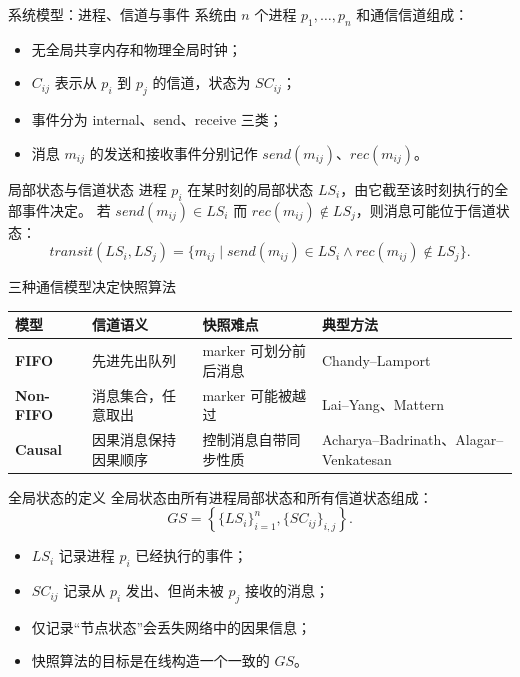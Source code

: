 \documentclass[UTF8,fontset=none,aspectratio=169,10pt]{beamer}
\begin{document}
\begin{frame}{系统模型：进程、信道与事件}
系统由 $n$ 个进程 $p_1,\ldots,p_n$ 和通信信道组成：
\begin{itemize}
  \item 无全局共享内存和物理全局时钟；
  \item $C_{ij}$ 表示从 $p_i$ 到 $p_j$ 的信道，状态为 $SC_{ij}$；
  \item 事件分为 internal、send、receive 三类；
  \item 消息 $m_{ij}$ 的发送和接收事件分别记作 $send(m_{ij})$、$rec(m_{ij})$。
\end{itemize}
\end{frame}

\begin{frame}{局部状态与信道状态}
进程 $p_i$ 在某时刻的局部状态 $LS_i$，由它截至该时刻执行的全部事件决定。
\vfill
若 $send(m_{ij})\in LS_i$ 而 $rec(m_{ij})\notin LS_j$，则消息可能位于信道状态：
\[
transit(LS_i,LS_j)=\{m_{ij}\mid send(m_{ij})\in LS_i\land rec(m_{ij})\notin LS_j\}.
\]
\vfill
{}
\end{frame}

\begin{frame}{三种通信模型决定快照算法}
\begin{tabularx}{\linewidth}{>{\bfseries}p{2.3cm}XXX}
\toprule
模型 & 信道语义 & 快照难点 & 典型方法 \\
\midrule
FIFO & 先进先出队列 & marker 可划分前后消息 & Chandy--Lamport \\
Non-FIFO & 消息集合，任意取出 & marker 可能被越过 & Lai--Yang、Mattern \\
Causal & 因果消息保持因果顺序 & 控制消息自带同步性质 & Acharya--Badrinath、Alagar--Venkatesan \\
\bottomrule
\end{tabularx}
\end{frame}


\begin{frame}{全局状态的定义}
全局状态由所有进程局部状态和所有信道状态组成：
\[
GS=\left\{\{LS_i\}_{i=1}^{n},\{SC_{ij}\}_{i,j}\right\}.
\]
\begin{itemize}
  \item $LS_i$ 记录进程 $p_i$ 已经执行的事件；
  \item $SC_{ij}$ 记录从 $p_i$ 发出、但尚未被 $p_j$ 接收的消息；
  \item 仅记录“节点状态”会丢失网络中的因果信息；
  \item 快照算法的目标是在线构造一个一致的 $GS$。
\end{itemize}
\end{frame}
\end{document}
